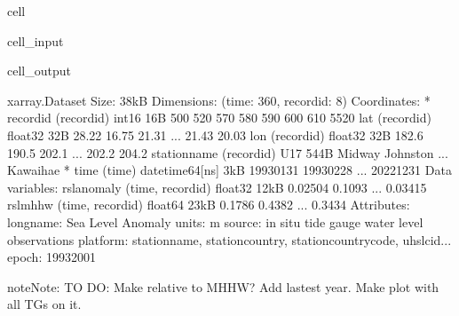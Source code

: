 \documentclass[letterpaper,10pt,english]{jupyterBook}
\begin{document}
\begin{sphinxuseclass}{cell}\begin{sphinxVerbatimInput}

\begin{sphinxuseclass}{cell_input}
\begin{sphinxVerbatim}[commandchars=\\\{\}]
\end{sphinxVerbatim}

\end{sphinxuseclass}\end{sphinxVerbatimInput}
\begin{sphinxVerbatimOutput}

\begin{sphinxuseclass}{cell_output}
\begin{sphinxVerbatim}[commandchars=\\\{\}]
\PYGZlt{}xarray.Dataset\PYGZgt{} Size: 38kB
Dimensions:       (time: 360, record\PYGZus{}id: 8)
Coordinates:
  * record\PYGZus{}id     (record\PYGZus{}id) int16 16B 500 520 570 580 590 600 610 5520
    lat           (record\PYGZus{}id) float32 32B 28.22 16.75 21.31 ... 21.43 20.03
    lon           (record\PYGZus{}id) float32 32B 182.6 190.5 202.1 ... 202.2 204.2
    station\PYGZus{}name  (record\PYGZus{}id) \PYGZlt{}U17 544B \PYGZsq{}Midway\PYGZsq{} \PYGZsq{}Johnston\PYGZsq{} ... \PYGZsq{}Kawaihae\PYGZsq{}
  * time          (time) datetime64[ns] 3kB 1993\PYGZhy{}01\PYGZhy{}31 1993\PYGZhy{}02\PYGZhy{}28 ... 2022\PYGZhy{}12\PYGZhy{}31
Data variables:
    rsl\PYGZus{}anomaly   (time, record\PYGZus{}id) float32 12kB \PYGZhy{}0.02504 \PYGZhy{}0.1093 ... \PYGZhy{}0.03415
    rsl\PYGZus{}mhhw      (time, record\PYGZus{}id) float64 23kB \PYGZhy{}0.1786 \PYGZhy{}0.4382 ... \PYGZhy{}0.3434
Attributes:
    long\PYGZus{}name:  Sea Level Anomaly
    units:      m
    source:     in situ tide gauge water level observations
    platform:   station\PYGZus{}name, station\PYGZus{}country, station\PYGZus{}country\PYGZus{}code, uhslc\PYGZus{}id...
    epoch:      1993\PYGZhy{}2001
\end{sphinxVerbatim}

\end{sphinxuseclass}\end{sphinxVerbatimOutput}

\end{sphinxuseclass}
\begin{sphinxShadowBox}
\sphinxstylesidebartitle{}

\begin{sphinxadmonition}{note}{Note:}
\sphinxAtStartPar
TO DO: Make relative to MHHW? Add lastest year. Make plot with all TGs on it.
\end{sphinxadmonition}
\end{sphinxShadowBox}
\end{document}

